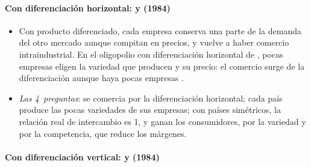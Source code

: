 \documentclass[11pt]{article}
\begin{document}
\paragraph{Con diferenciación horizontal:  y  (1984)}

\begin{itemize}
\item Con producto diferenciado, cada empresa conserva una parte de la demanda del otro mercado aunque compitan en precios, y vuelve a haber comercio intraindustrial. En el oligopolio con diferenciación horizontal de \textcite{EatonKierzkowski1984Oligopolistic}, pocas empresas eligen la variedad que producen y su precio: el comercio surge de la diferenciación aunque haya pocas empresas .
\item \emph{Las 4~preguntas}: se comercia por la diferenciación horizontal; cada país produce las pocas variedades de sus empresas; con países simétricos, la relación real de intercambio es 1, y ganan los consumidores, por la variedad y por la competencia, que reduce los márgenes.
\end{itemize}

\paragraph{Con diferenciación vertical:  y  (1984)}
\end{document}
